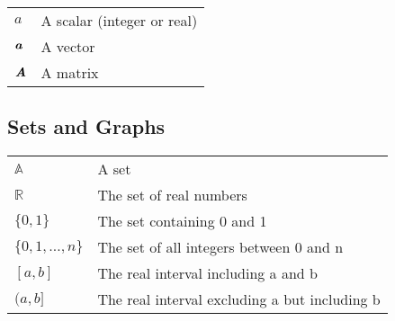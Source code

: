 \begin{tabular}{ll}
  $a$                 & A scalar (integer or real) \\
  $\textbf{\em a}$        & A vector \\
  $\textbf{\em A}$        & A matrix \\
\end{tabular}

\subsection*{Sets and Graphs}

\begin{tabular}{ll}
  $\mathbb{A}$        & A set \\
  $\mathbb{R}$        & The set of real numbers \\
  $\{0, 1\}$          & The set containing 0 and 1 \\
  $\{0,1,\ldots,n\}$  & The set of all integers between 0 and n \\
  $[a, b]$            & The real interval including a and b \\
  $(a, b]$            & The real interval excluding a but including b \\
\end{tabular}



\cleardoublepage
\storeinipagenumber
{}
\setcounter{page}{1}
